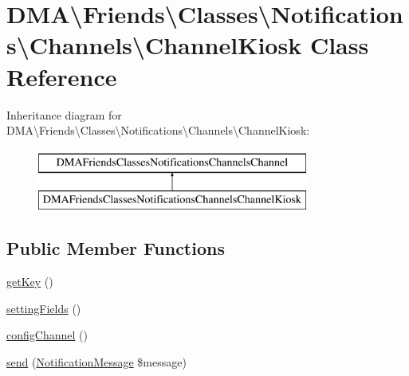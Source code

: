 \hypertarget{classDMA_1_1Friends_1_1Classes_1_1Notifications_1_1Channels_1_1ChannelKiosk}{\section{D\-M\-A\textbackslash{}Friends\textbackslash{}Classes\textbackslash{}Notifications\textbackslash{}Channels\textbackslash{}Channel\-Kiosk Class Reference}
\label{classDMA_1_1Friends_1_1Classes_1_1Notifications_1_1Channels_1_1ChannelKiosk}
}
Inheritance diagram for D\-M\-A\textbackslash{}Friends\textbackslash{}Classes\textbackslash{}Notifications\textbackslash{}Channels\textbackslash{}Channel\-Kiosk\-:\begin{figure}[H]
\begin{center}
\leavevmode
\includegraphics[height=2.000000cm]{d5/d75/classDMA_1_1Friends_1_1Classes_1_1Notifications_1_1Channels_1_1ChannelKiosk}
\end{center}
\end{figure}
\subsection*{Public Member Functions}
\begin{DoxyCompactItemize}
\item 
\hyperlink{classDMA_1_1Friends_1_1Classes_1_1Notifications_1_1Channels_1_1ChannelKiosk_a2b78d43d774c4a3ad51bda474f63867f}{get\-Key} ()
\item 
\hyperlink{classDMA_1_1Friends_1_1Classes_1_1Notifications_1_1Channels_1_1ChannelKiosk_aed0a11ddc080fa7252d6fe6a3faa7b29}{setting\-Fields} ()
\item 
\hyperlink{classDMA_1_1Friends_1_1Classes_1_1Notifications_1_1Channels_1_1ChannelKiosk_ac40190da8647ca059590db8800bbbf2b}{config\-Channel} ()
\item 
\hyperlink{classDMA_1_1Friends_1_1Classes_1_1Notifications_1_1Channels_1_1ChannelKiosk_ab3ad4b0bf7c129767eb323528a439ed8}{send} (\hyperlink{classDMA_1_1Friends_1_1Classes_1_1Notifications_1_1NotificationMessage}{Notification\-Message} \$message)
\end{DoxyCompactItemize}


